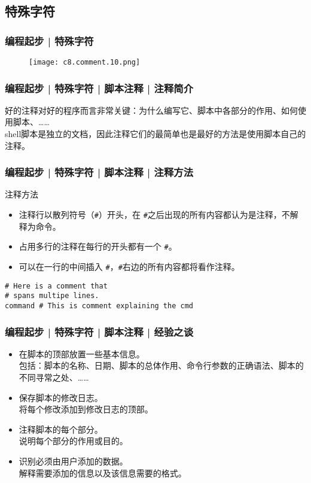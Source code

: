 \subsection{特殊字符}
\begin{frame}
  \frametitle{编程起步 | \alert{特殊字符}}
  \begin{figure}
    \centering
    \texttt{[image: c8.comment.10.png]}
  \end{figure}
\end{frame}

\begin{frame}
  \frametitle{编程起步 | 特殊字符 | 脚本注释 | 注释简介}
  好的注释对好的程序而言非常关键：为什么编写它、脚本中各部分的作用、如何使用脚本、……\\
  shell脚本是独立的文档，因此注释它们的最简单也是最好的方法是使用脚本自己的注释。
\end{frame}

\begin{frame}[fragile]
  \frametitle{编程起步 | 特殊字符 | 脚本注释 | \alert{注释方法}}
  \begin{block}{注释方法}
    \begin{itemize}
      \item 注释行以散列符号（\verb|#|）开头，在 \verb|#|之后出现的所有内容都认为是注释，不解释为命令。
      \item 占用多行的注释在每行的开头都有一个 \verb|#|。
      \item 可以在一行的中间插入 \verb|#|，\verb|#|右边的所有内容都将看作注释。
    \end{itemize}
  \end{block}
  \pause
\begin{lstlisting}
# Here is a comment that
# spans multipe lines.
command # This is comment explaining the cmd
\end{lstlisting}
\end{frame}

\begin{frame}
  \frametitle{编程起步 | 特殊字符 | 脚本注释 | 经验之谈}
  \begin{itemize}
    \item 在脚本的顶部放置一些基本信息。\\ \qquad 包括：脚本的名称、日期、脚本的总体作用、命令行参数的正确语法、脚本的不同寻常之处、……
    \item 保存脚本的修改日志。\\ \qquad 将每个修改添加到修改日志的顶部。
    \item 注释脚本的每个部分。\\ \qquad 说明每个部分的作用或目的。
    \item 识别必须由用户添加的数据。\\ \qquad 解释需要添加的信息以及该信息需要的格式。
  \end{itemize}
\end{frame}

